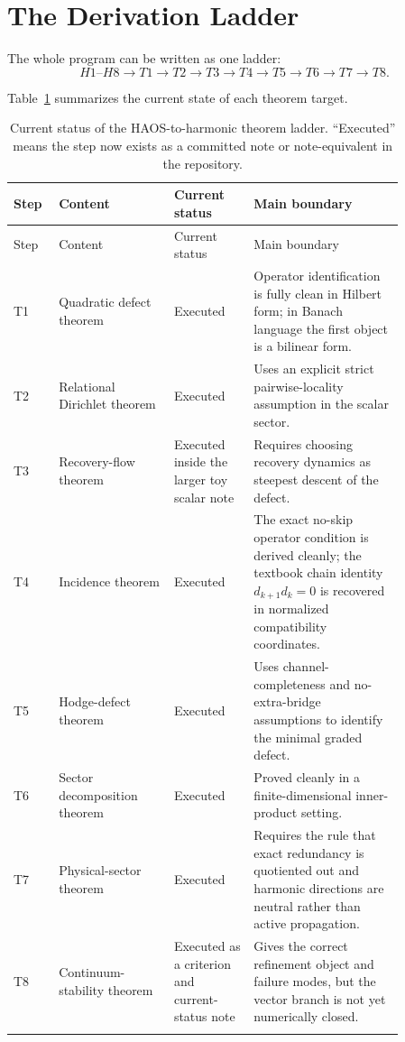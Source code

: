 \documentclass[11pt]{article}
\begin{document}
\section{The Derivation Ladder}

The whole program can be written as one ladder:
\[
H1\text{--}H8
\to
T1
\to
T2
\to
T3
\to
T4
\to
T5
\to
T6
\to
T7
\to
T8.
\]

Table~\ref{tab:ladder} summarizes the current state of each theorem target.

\begin{longtable}{p{0.08\linewidth}p{0.26\linewidth}p{0.18\linewidth}p{0.34\linewidth}}
\caption{Current status of the HAOS-to-harmonic theorem ladder. ``Executed'' means the step now exists as a committed note or note-equivalent in the repository.}\\
\toprule
Step & Content & Current status & Main boundary \\
\midrule
\endfirsthead
\toprule
Step & Content & Current status & Main boundary \\
\midrule
\endhead
T1 & Quadratic defect theorem & Executed & Operator identification is fully clean in Hilbert form; in Banach language the first object is a bilinear form. \\
T2 & Relational Dirichlet theorem & Executed & Uses an explicit strict pairwise-locality assumption in the scalar sector. \\
T3 & Recovery-flow theorem & Executed inside the larger toy scalar note & Requires choosing recovery dynamics as steepest descent of the defect. \\
T4 & Incidence theorem & Executed & The exact no-skip operator condition is derived cleanly; the textbook chain identity $d_{k+1}d_k=0$ is recovered in normalized compatibility coordinates. \\
T5 & Hodge-defect theorem & Executed & Uses channel-completeness and no-extra-bridge assumptions to identify the minimal graded defect. \\
T6 & Sector decomposition theorem & Executed & Proved cleanly in a finite-dimensional inner-product setting. \\
T7 & Physical-sector theorem & Executed & Requires the rule that exact redundancy is quotiented out and harmonic directions are neutral rather than active propagation. \\
T8 & Continuum-stability theorem & Executed as a criterion and current-status note & Gives the correct refinement object and failure modes, but the vector branch is not yet numerically closed. \\
\bottomrule
\label{tab:ladder}
\end{longtable}
\end{document}
